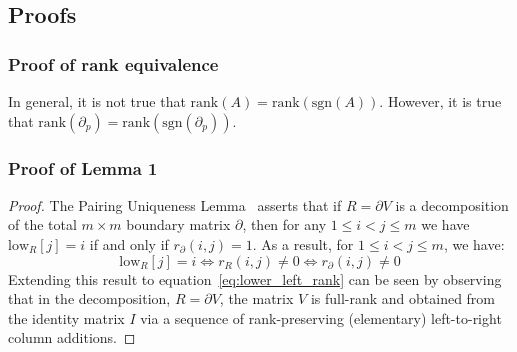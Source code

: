 \documentclass[10pt]{article}
\numberwithin{equation}{section}
\newcommand{\+}{%
	\raisebox{0.18ex}{\scaleobj{0.55}{+}}
}
\theoremstyle{definition}
\begin{document}
\subsection{Proofs}
\subsubsection*{Proof of rank equivalence}
In general, it is not true that $\mathrm{rank}(A) = \mathrm{rank}(\mathrm{sgn}(A))$. 
However, it is true that $\mathrm{rank}(\partial_p) = \mathrm{rank}(\mathrm{sgn}(\partial_p))$.
\subsubsection*{Proof of Lemma 1}
\begin{proof}
	The Pairing Uniqueness Lemma~\cite{dey2022computational} asserts that if $R = \partial V$ is a decomposition of the total $m \times m$ boundary matrix $\partial$, then for any $1 \leq i < j \leq m$ we have $\mathrm{low}_R[j] = i$ if and only if $r_\partial(i,j) = 1$. 
	As a result, for $1 \leq i < j \leq m$, we have:
\begin{equation}
	\mathrm{low}_R[j] = i \iff r_R(i,j) \neq 0 \iff r_\partial(i,j) \neq 0
\end{equation} 
Extending this result to equation~\eqref{eq:lower_left_rank} can be seen by observing that in the decomposition, $R = \partial V$, the matrix $V$ is full-rank and obtained from the identity matrix $I$ via a sequence of rank-preserving (elementary) left-to-right column additions.  
\end{proof}
\end{document}

